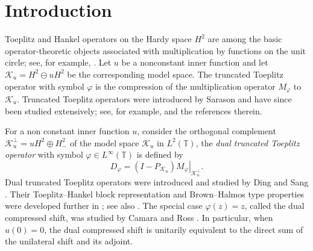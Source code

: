 \documentclass[12pt]{amsart}
\theoremstyle{definition}
\theoremstyle{remark}
\def \T{\mathbb{T}}
\newcommand{\clk}{\mathcal{K}}
\newcommand{\vp}{\varphi}
\newcommand\restr[2]{\ensuremath{\left.#1\right|_{#2}}}
\numberwithin{equation}{section}
\begin{document}
\maketitle	
	

\section{Introduction}
Toeplitz and Hankel operators on the Hardy space $H^2$ are among the
basic operator-theoretic objects associated with multiplication by
functions on the unit circle; see, for example,
\cite{Bercovivi,Duren,Garnett,Peller:Book}. Let $u$ be a nonconstant
inner function and let $\clk_u=H^2\ominus uH^2$ be the corresponding model space. The truncated Toeplitz operator with symbol $\vp$ is the compression of the multiplication operator $M_\vp$ to $\clk_u$. Truncated Toeplitz operators were introduced by Sarason \cite{Sarason2007} and have since been studied extensively; see, for example, \cite{Camara2020,Garcia2016} and the references therein.

For a non constant inner function $u$, consider the orthogonal complement $\clk_u^\perp=uH^2\oplus H^2_{-}$ of the model space $\clk_u$ in $L^2(\T)$, the \emph{dual truncated Toeplitz operator} with symbol $\vp\in L^\infty(\T)$ is defined by
\[
D_\vp=\restr{(I-P_{\clk_u})M_\vp}{\clk_u^\perp}.
\]
Dual truncated Toeplitz operators were introduced and studied by
Ding and Sang \cite{Sang:Ding}. Their Toeplitz--Hankel block
representation and Brown--Halmos type properties were developed
further in \cite{Sang:Qin:Ding}; see also
\cite{BhuiaRameshNag,Gu,Li:Sang:Ding,Wang:Zhao:Zheng}. The special
case $\vp(z)=z$, called the dual compressed shift, was studied by
Camara and Ross \cite{Camara2021}. In particular, when $u(0)=0$,
the dual compressed shift is unitarily equivalent to the direct sum
of the unilateral shift and its adjoint.
\end{document}
